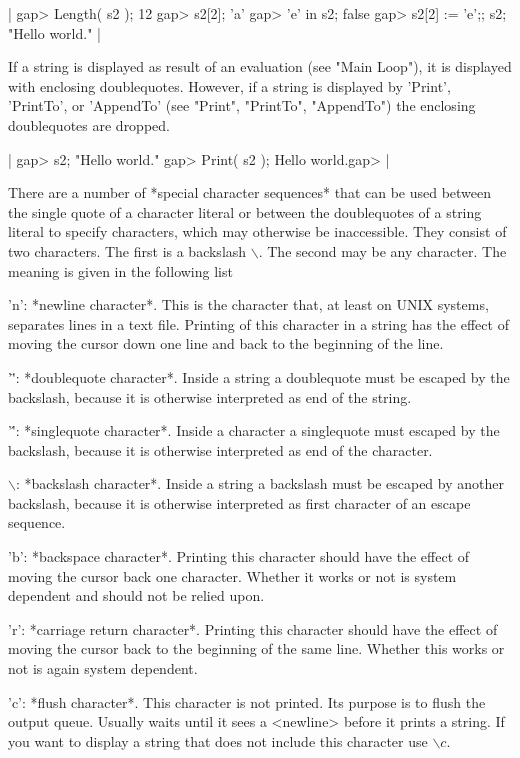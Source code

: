 |    gap> Length( s2 );
    12
    gap> s2[2];
    'a'
    gap> 'e' in s2;
    false
    gap> s2[2] := 'e';;  s2;
    "Hello world." |

If a string is displayed as result of an evaluation (see "Main Loop"), it
is  displayed  with enclosing   doublequotes.  However,  if  a  string is
displayed by 'Print',  'PrintTo', or 'AppendTo' (see "Print",  "PrintTo",
"AppendTo") the enclosing doublequotes are dropped.

|    gap> s2;
    "Hello world."
    gap> Print( s2 );
    Hello world.gap> |

There  are a number  of *special character  sequences* that  can be  used
between   the  single  quote  of  a  character  literal  or  between  the
doublequotes  of  a  string  literal to  specify  characters,  which  may
otherwise be inaccessible.  They consist of two characters.  The first is
a  backslash $\backslash$.  The second may be any character.  The meaning
is given in the following list

'n':    *newline character*.  This  is  the character that, at   least on
        UNIX systems, separates  lines in a  text file.  Printing of this
        character in a string has the effect of moving  the  cursor  down
        one line and back to the beginning  of the line.

'\"':    *doublequote character*.  Inside  a string a doublequote  must be
        escaped by the backslash,  because it is otherwise interpreted as
        end of the string.

'\'':    *singlequote character*.  Inside a character a  singlequote  must
        escaped by the backslash, because it is  otherwise interpreted as
        end of the character.

$\backslash$:  *backslash character*.  Inside  a string a backslash  must
        be   escaped  by  another  backslash,    because it is  otherwise
        interpreted as first character of an escape sequence.

'b':    *backspace character*.  Printing this character should  have  the
        effect of moving the cursor back one character.  Whether it works
        or not is system dependent and should not be relied upon.

'r':    *carriage return character*.  Printing this character should have
        the effect of moving the cursor back to the beginning of the same
        line.  Whether this works or not is again system dependent.

'c':    *flush character*.  This character is not  printed.  Its  purpose
        is to flush the output queue.  Usually {\GAP} waits until it sees
        a <newline> before it prints a string.  If you want to display  a
        string that does not include this character use $\backslash c$.

